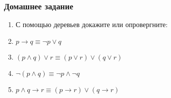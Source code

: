 \documentclass[10pt]{beamer}
\begin{document}
\begin{frame}
\frametitle{Домашнее задание}
\begin{enumerate}
    \item[] С помощью деревьев докажите или опровергните:
    \item $p \to q \equiv \neg p \lor q$
    \item $(p \land q) \lor r \equiv (p \lor r) \lor (q \lor r)$
    \item $\neg (p \land q) \equiv \neg p \land \neg q$
    \item $p \land q \to r \equiv (p \to r) \lor (q \to r)$
\end{enumerate}
\end{frame}
\end{document}
